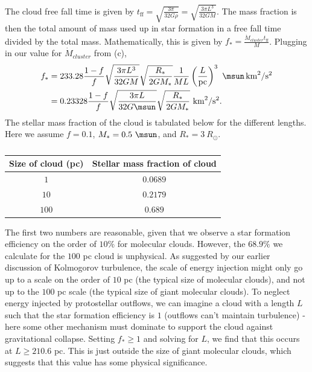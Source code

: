 \documentclass[11pt]{article}
\newenvironment{tight_enumerate}{
    \begin{enumerate}[label=(\alph*)]
    \setlength{\itemsep}{3pt}
    \setlength{\parskip}{0pt}}
    {\end{enumerate}}
\begin{document}
\begin{tight_enumerate}
\item The cloud free fall time is given by $t_{\text{ff}} = \sqrt{\frac{3\pi}{32G\rho}} = \sqrt{\frac{3{\pi}L^{3}}{32GM}}$. The mass fraction is then the total amount of mass used up in star formation in a free fall time divided by the total mass. Mathematically, this is given by $f_{*} = \frac{\dot{M}_{cluster}t_{\text{ff}}}{M}$. Plugging in our value for $\dot{M}_{cluster}$ from (c), 
\begin{align*}
f_{*} &= 233.28\frac{1-f}{f}\sqrt{\frac{3{\pi}L^{3}}{32GM}}\sqrt{\frac{R_{*}}{2GM_{*}}}\frac{1}{ML}\left(\frac{L}{\si{pc}}\right)^{3}\ \si{\msun.km^{2}/s^{2}} \\
&= 0.23328\frac{1-f}{f}\sqrt{\frac{3{\pi}L}{32G\si{\msun}}}\sqrt{\frac{R_{*}}{2GM_{*}}}\ \si{km^{2}/s^{2}}.
\end{align*}
The stellar mass fraction of the cloud is tabulated below for the different lengths. Here we assume $f = 0.1$, $M_{*} = 0.5\ \si{\msun}$, and $R_{*} = 3\ R_{\odot}$.
\begin{table}[H]
\centering
\begin{tabular}{|c|c|}
\hline
Size of cloud (\si{pc}) & Stellar mass fraction of cloud \\
\hline
$1$ & $0.0689$ \\
$10$ & $0.2179$ \\
$100$ & $0.689$ \\
\hline
\end{tabular}
\caption*{}
\end{table}
The first two numbers are reasonable, given that we observe a star formation efficiency on the order of $10\%$ for molecular clouds. However, the $68.9\%$ we calculate for the $100$ \si{pc} cloud is unphysical. As suggested by our earlier discussion of Kolmogorov turbulence, the scale of energy injection might only go up to a scale on the order of $10$ \si{pc} (the typical size of molecular clouds), and not up to the $100$ \si{pc} scale (the typical size of giant molecular clouds). To neglect energy injected by protostellar outflows, we can imagine a cloud with a length $L$ such that the star formation efficiency is $1$ (outflows can't maintain turbulence) - here some other mechanism must dominate to support the cloud against gravitational collapse. Setting $f_{*} \geq 1$ and solving for $L$, we find that this occurs at $L \geq 210.6$ \si{pc}. This is just outside the size of giant molecular clouds, which suggests that this value has some physical significance.
\end{tight_enumerate}
\end{document}
